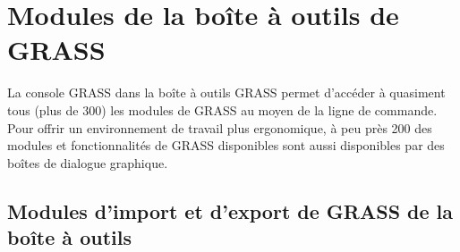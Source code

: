 \section{Modules de la boîte à outils de GRASS }\label{appdx_grass_toolbox_modules}

La console GRASS dans la boîte à outils GRASS permet d'accéder à quasiment tous (plus de 300) les modules de GRASS au moyen de la ligne de commande. Pour offrir un environnement de travail plus ergonomique, à peu près 200 des modules et fonctionnalités de GRASS disponibles sont aussi disponibles par des boîtes de dialogue graphique.

\subsection{Modules d'import et d'export de GRASS de la boîte à outils}


